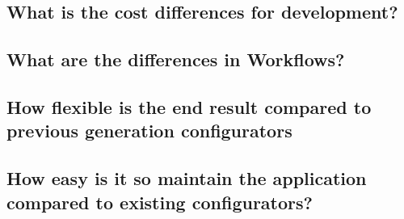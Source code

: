 \subsection{What is the cost differences for development?}

\subsection{What are the differences in Workflows?}

\subsection{How flexible is the end result compared to previous generation configurators}

\subsection{How easy is it so maintain the application compared to existing configurators?}

